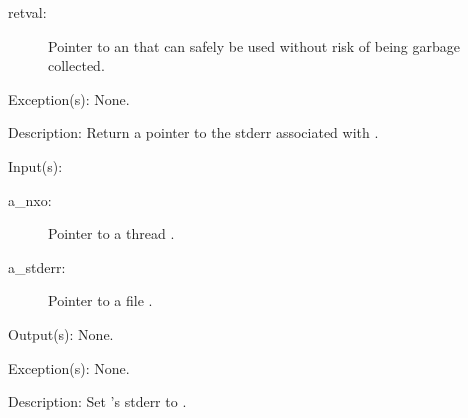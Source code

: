 \begin{capi}
\begin{capilist}
\begin{description}
		\item[retval: ]
			Pointer to an  that can safely be used
			without risk of being garbage collected.
		\end{description}
	\item[Exception(s): ] None.
	\item[Description: ]
		Return a pointer to the stderr associated with .
	\end{capilist}
\label{nxo_thread_stderr_set}
	\begin{capilist}
	\item[Input(s): ]
		\begin{description}\item[]
		\item[a\_nxo: ]
			Pointer to a thread .
		\item[a\_stderr: ]
			Pointer to a file .
		\end{description}
	\item[Output(s): ] None.
	\item[Exception(s): ] None.
	\item[Description: ]
		Set 's stderr to .
	\end{capilist}
\end{capi}
